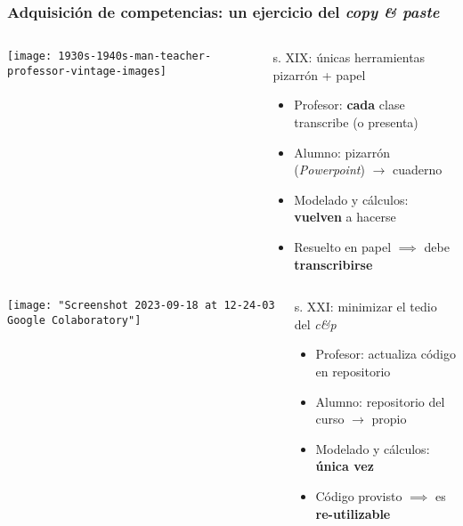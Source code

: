 \documentclass[aspectratio=43]{beamer}
\begin{document}
\begin{frame}
	\frametitle{Adquisición de competencias: un ejercicio del \emph{copy \& paste}}
	\begin{block}{}
	  \begin{columns}[b]
			\begin{column}{0.3\textwidth}
				\texttt{[image: 1930s-1940s-man-teacher-professor-vintage-images]}
			\end{column}
			\begin{column}{0.65\textwidth}
				s. XIX: únicas herramientas pizarrón + papel
				\pause
				\begin{itemize}[<+->]
					\item Profesor: \textbf{cada} clase transcribe (o presenta)
					\item Alumno: pizarrón (\emph{Powerpoint}) \(\rightarrow\) cuaderno
					\item Modelado y cálculos: \textbf{vuelven} a hacerse
					\item Resuelto en papel \(\implies\) debe \textbf{transcribirse}
				\end{itemize}
			\end{column}
		\end{columns}
	\end{block}

	\pause
	\begin{block}{}
	  \begin{columns}[b]
			\begin{column}{0.3\textwidth}
				\texttt{[image: "Screenshot 2023-09-18 at 12-24-03 Google Colaboratory"]}
			\end{column}
			\begin{column}{0.65\textwidth}
				s. XXI: minimizar el tedio del \emph{c\&p}
				\begin{itemize}[<+->]
					\item Profesor: actualiza código en repositorio
					\item Alumno: repositorio del curso \(\rightarrow\) propio
					\item Modelado y cálculos: \textbf{única vez}
					\item Código provisto \(\implies\) es \textbf{re-utilizable} 
				\end{itemize}
			\end{column}
		\end{columns}
	\end{block}
\end{frame}
\end{document}
